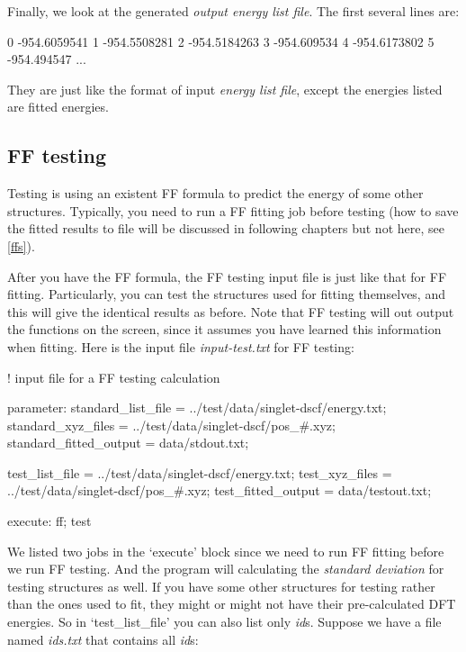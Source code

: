 \documentclass[11pt]{book}
\begin{document}
Finally, we look at the generated \emph{output energy list file}. The first several lines are:

\begin{everbatim}
0 -954.6059541
1 -954.5508281
2 -954.5184263
3 -954.609534
4 -954.6173802
5 -954.494547
...
\end{everbatim}

They are just like the format of input \emph{energy list file}, except the energies listed are fitted energies. 

\subsection{FF testing}

Testing is using an existent FF formula to predict the energy of some other structures. 
Typically, you need to run a FF fitting job before testing (how to save the fitted results to file will be discussed 
in following chapters but not here, see \ref{ffs}).

After you have the FF formula, the FF testing input file is just like that for FF fitting. Particularly, 
you can test the structures used for fitting themselves, and this will give the identical results as before. 
Note that FF testing will out output the functions on the screen, since it assumes you have learned this information 
when fitting. Here is the input file \emph{input-test.txt} for FF testing:

\begin{everbatim}

! input file for a FF testing calculation

{ parameter: 
   standard_list_file     = ../test/data/singlet-dscf/energy.txt;
   standard_xyz_files     = ../test/data/singlet-dscf/pos_#.xyz;
   standard_fitted_output = data/stdout.txt;
   
   test_list_file         = ../test/data/singlet-dscf/energy.txt;
   test_xyz_files         = ../test/data/singlet-dscf/pos_#.xyz;
   test_fitted_output     = data/testout.txt;
}
{ execute: ff; test }

\end{everbatim}

We listed two jobs in the `execute' block since we need to run FF fitting before we run FF testing. 
And the program will calculating the \emph{standard deviation} for testing structures as well.
If you have some other structures for testing rather than the ones used to fit, they might or might not have 
their pre-calculated DFT energies. So in `test\_list\_file' you can also list only \emph{id}s. 
Suppose we have a file named \emph{ids.txt} that contains all \emph{id}s:
\end{document}
